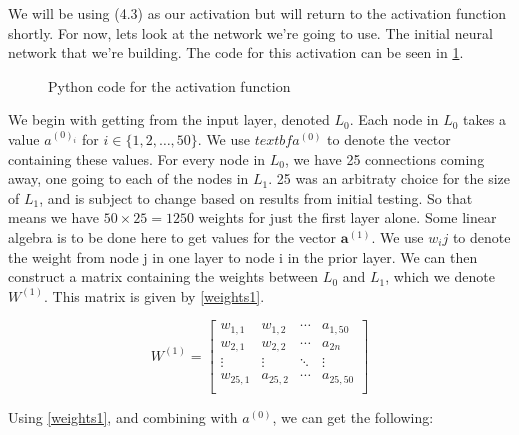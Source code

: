 We will be using (4.3) as our activation but will return to the activation function shortly. For now, lets look at the network we're going to use.
The initial neural network that we're building. The code for this activation can be seen in \ref{pyact}.

\begin{figure} %
    
    \caption{Python code for the activation function}
    \label{pyact}
\end{figure}


We begin with getting from the input layer, denoted $L_0$. Each node in $L_0$ takes a value $a^{(0)_i}$ for $i \in \{1,2,\ldots,50\}$. We use $textbf{a}^(0)$ to denote the vector
containing these values. For every node in $L_0$, we have 25 connections coming away, one going to each of the nodes in $L_1$. 25 was an arbitraty choice for the size of $L_1$, and is
subject to change based on results from initial testing. So that means we have $50 \times 25 = 1250$ weights for just the first layer alone. Some linear algebra is to be done here to get 
values for the vector $\textbf{a}^{(1)}$. We use $w_ij$ to denote the weight from node j in one layer to node i in the prior layer. We can then construct a matrix containing the weights
between $L_0$ and $L_1$, which we denote $W^{(1)}$. This matrix is given by \ref{weights1}.

\begin{equation}
    W^{(1)} =
    \left[ {\begin{array}{cccc}
      w_{1,1} & w_{1,2} & \cdots & a_{1,50}\\
      w_{2,1} & w_{2,2} & \cdots & a_{2n}\\
      \vdots & \vdots & \ddots & \vdots\\
      w_{25,1} & a_{25,2} & \cdots & a_{25,50}\\
    \end{array} } \right]
    \label{weights1}
\end{equation}

Using \ref{weights1}, and combining with $a^{(0)}$, we can get the following:

